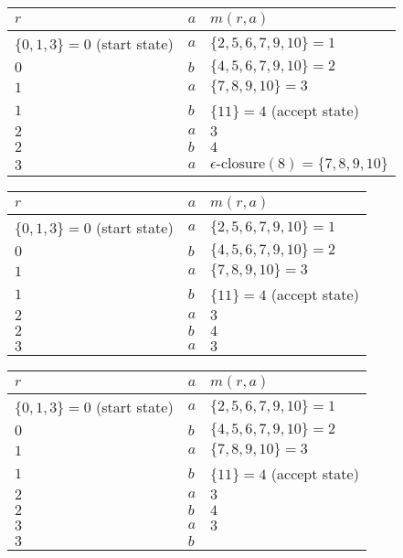 \documentclass[8pt,a4paper,compress]{beamer}
\begin{document}
\begin{frame}[fragile]
\begin{overprint}
\begin{center}
\begin{tabular}{|C{4cm}|C{.5cm}|C{4cm}|} \hline
$r$ & $a$ & $m(r, a)$ \\ \hline \hline
$\{0, 1, 3\} = 0$ (start state) & $a$ &  $\{2, 5, 6, 7, 9, 10\} = 1$ \\ \hline
$0$ & $b$ & $\{4, 5, 6, 7, 9, 10\} = 2$  \\ \hline
$1$ & $a$ & $\{7, 8, 9, 10\} = 3$  \\ \hline
$1$ & $b$ & $\{11\} = 4$ (accept state)  \\ \hline
$2$ & $a$ & $3$ \\ \hline
$2$ & $b$ & $4$ \\ \hline
$3$ & $a$ & $\epsilon\text{-closure}(8) = \{7, 8, 9, 10\}$ \\ \hline
\end{tabular}
\end{center}

\begin{center}
\begin{tabular}{|C{4cm}|C{.5cm}|C{4cm}|} \hline
$r$ & $a$ & $m(r, a)$ \\ \hline \hline
$\{0, 1, 3\} = 0$ (start state) & $a$ &  $\{2, 5, 6, 7, 9, 10\} = 1$ \\ \hline
$0$ & $b$ & $\{4, 5, 6, 7, 9, 10\} = 2$  \\ \hline
$1$ & $a$ & $\{7, 8, 9, 10\} = 3$  \\ \hline
$1$ & $b$ & $\{11\} = 4$ (accept state)  \\ \hline
$2$ & $a$ & $3$ \\ \hline
$2$ & $b$ & $4$ \\ \hline
$3$ & $a$ & $3$ \\ \hline
\end{tabular}
\end{center}

\begin{center}
\begin{tabular}{|C{4cm}|C{.5cm}|C{4cm}|} \hline
$r$ & $a$ & $m(r, a)$ \\ \hline \hline
$\{0, 1, 3\} = 0$ (start state) & $a$ &  $\{2, 5, 6, 7, 9, 10\} = 1$ \\ \hline
$0$ & $b$ & $\{4, 5, 6, 7, 9, 10\} = 2$  \\ \hline
$1$ & $a$ & $\{7, 8, 9, 10\} = 3$  \\ \hline
$1$ & $b$ & $\{11\} = 4$ (accept state) \\ \hline
$2$ & $a$ & $3$ \\ \hline
$2$ & $b$ & $4$ \\ \hline
$3$ & $a$ & $3$ \\ \hline
$3$ & $b$ &  \\ \hline
\end{tabular}
\end{center}


\end{overprint}
\end{frame}
\end{document}
